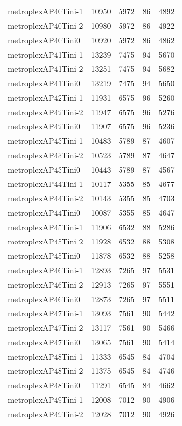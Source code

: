 \begin{longtable}{lrrrr}
metroplexAP40Tini-1 & 10950 & 5972 & 86 & 4892 \\
metroplexAP40Tini-2 & 10980 & 5972 & 86 & 4922 \\
metroplexAP40Tini0 & 10920 & 5972 & 86 & 4862 \\
metroplexAP41Tini-1 & 13239 & 7475 & 94 & 5670 \\
metroplexAP41Tini-2 & 13251 & 7475 & 94 & 5682 \\
metroplexAP41Tini0 & 13219 & 7475 & 94 & 5650 \\
metroplexAP42Tini-1 & 11931 & 6575 & 96 & 5260 \\
metroplexAP42Tini-2 & 11947 & 6575 & 96 & 5276 \\
metroplexAP42Tini0 & 11907 & 6575 & 96 & 5236 \\
metroplexAP43Tini-1 & 10483 & 5789 & 87 & 4607 \\
metroplexAP43Tini-2 & 10523 & 5789 & 87 & 4647 \\
metroplexAP43Tini0 & 10443 & 5789 & 87 & 4567 \\
metroplexAP44Tini-1 & 10117 & 5355 & 85 & 4677 \\
metroplexAP44Tini-2 & 10143 & 5355 & 85 & 4703 \\
metroplexAP44Tini0 & 10087 & 5355 & 85 & 4647 \\
metroplexAP45Tini-1 & 11906 & 6532 & 88 & 5286 \\
metroplexAP45Tini-2 & 11928 & 6532 & 88 & 5308 \\
metroplexAP45Tini0 & 11878 & 6532 & 88 & 5258 \\
metroplexAP46Tini-1 & 12893 & 7265 & 97 & 5531 \\
metroplexAP46Tini-2 & 12913 & 7265 & 97 & 5551 \\
metroplexAP46Tini0 & 12873 & 7265 & 97 & 5511 \\
metroplexAP47Tini-1 & 13093 & 7561 & 90 & 5442 \\
metroplexAP47Tini-2 & 13117 & 7561 & 90 & 5466 \\
metroplexAP47Tini0 & 13065 & 7561 & 90 & 5414 \\
metroplexAP48Tini-1 & 11333 & 6545 & 84 & 4704 \\
metroplexAP48Tini-2 & 11375 & 6545 & 84 & 4746 \\
metroplexAP48Tini0 & 11291 & 6545 & 84 & 4662 \\
metroplexAP49Tini-1 & 12008 & 7012 & 90 & 4906 \\
metroplexAP49Tini-2 & 12028 & 7012 & 90 & 4926 \\

\end{longtable}
